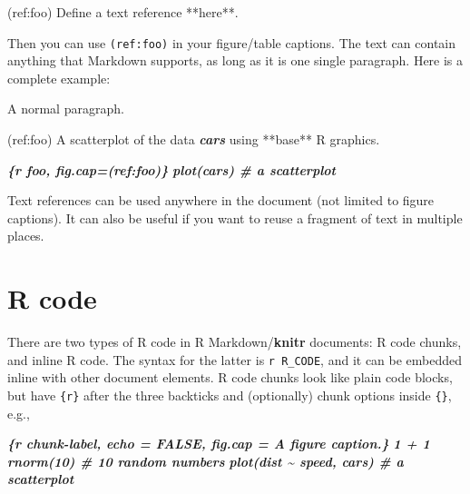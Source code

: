 \documentclass[
  12pt,
]{krantz}
\newenvironment{Shaded}{\begin{snugshade}}{\end{snugshade}}
\newcommand{\InformationTok}[1]{\textcolor[rgb]{0.56,0.35,0.01}{\textbf{\textit{#1}}}}
\newcommand{\NormalTok}[1]{#1}
\theoremstyle{definition}
\theoremstyle{definition}
\theoremstyle{definition}
\theoremstyle{definition}
\theoremstyle{remark}
\begin{document}
\begin{Shaded}
\begin{Highlighting}[]
\NormalTok{(ref:foo) Define a text reference **here**. }
\end{Highlighting}
\end{Shaded}

Then you can use \texttt{(ref:foo)} in your figure/table captions. The text can contain anything that Markdown supports, as long as it is one single paragraph. Here is a complete example:

\begin{Shaded}
\begin{Highlighting}[]
\NormalTok{A normal paragraph.}

\NormalTok{(ref:foo) A scatterplot of the data }\InformationTok{\textasciigrave{}cars\textasciigrave{}}\NormalTok{ using **base** R graphics. }

\InformationTok{\textasciigrave{}\textasciigrave{}\textasciigrave{}\{r foo, fig.cap=\textquotesingle{}(ref:foo)\textquotesingle{}\}}
\InformationTok{plot(cars)  \# a scatterplot}
\InformationTok{\textasciigrave{}\textasciigrave{}\textasciigrave{}}
\end{Highlighting}
\end{Shaded}

Text references can be used anywhere in the document (not limited to figure captions). It can also be useful if you want to reuse a fragment of text in multiple places.

\section{R code}\label{r-code}

There are two types of R code in R Markdown/\textbf{knitr} documents: R code chunks, and inline R code. The syntax for the latter is \texttt{\textasciigrave{}r\ R\_CODE\textasciigrave{}}, and it can be embedded inline with other document elements. R code chunks look like plain code blocks, but have \texttt{\{r\}} after the three backticks and (optionally) chunk options inside \texttt{\{\}}, e.g.,

\begin{Shaded}
\begin{Highlighting}[]
\InformationTok{\textasciigrave{}\textasciigrave{}\textasciigrave{}\{r chunk{-}label, echo = FALSE, fig.cap = \textquotesingle{}A figure caption.\textquotesingle{}\}}
\InformationTok{1 + 1}
\InformationTok{rnorm(10)  \# 10 random numbers}
\InformationTok{plot(dist \textasciitilde{} speed, cars)  \# a scatterplot}
\InformationTok{\textasciigrave{}\textasciigrave{}\textasciigrave{}}
\end{Highlighting}
\end{Shaded}
\end{document}
